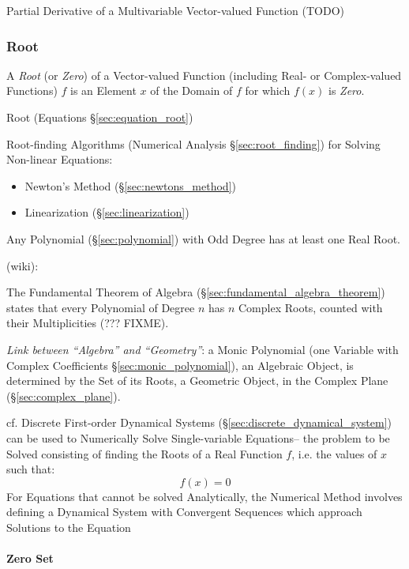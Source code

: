 Partial Derivative of a Multivariable Vector-valued Function (TODO)



\subsubsection{Root}\label{sec:function_root}

A \emph{Root} (or \emph{Zero}) of a Vector-valued Function (including Real- or
Complex-valued Functions) $f$ is an Element $x$ of the Domain of $f$ for which
$f(x)$ is \emph{Zero}.

\fist Root (Equations \S\ref{sec:equation_root})

\fist Root-finding Algorithms (Numerical Analysis \S\ref{sec:root_finding}) for
Solving Non-linear Equations:
\begin{itemize}
  \item Newton's Method (\S\ref{sec:newtons_method})
  \item Linearization (\S\ref{sec:linearization})
\end{itemize}

Any Polynomial (\S\ref{sec:polynomial}) with Odd Degree has at least
one Real Root.

(wiki):

The Fundamental Theorem of Algebra (\S\ref{sec:fundamental_algebra_theorem})
states that every Polynomial of Degree $n$ has $n$ Complex Roots, counted with
their Multiplicities (??? FIXME).

\emph{Link between ``Algebra'' and ``Geometry''}: a Monic Polynomial (one
Variable with Complex Coefficients \S\ref{sec:monic_polynomial}), an Algebraic
Object, is determined by the Set of its Roots, a Geometric Object, in the
Complex Plane (\S\ref{sec:complex_plane}).

\asterism

\fist cf. Discrete First-order Dynamical Systems
(\S\ref{sec:discrete_dynamical_system}) can be used to Numerically Solve
Single-variable Equations-- the problem to be Solved consisting of finding the
Roots of a Real Function $f$, i.e. the values of $x$ such that:
\[
  f(x) = 0
\]
For Equations that cannot be solved Analytically, the Numerical Method involves
defining a Dynamical System with Convergent Sequences which approach Solutions
to the Equation



\paragraph{Zero Set}\label{sec:zero_set}\hfill

